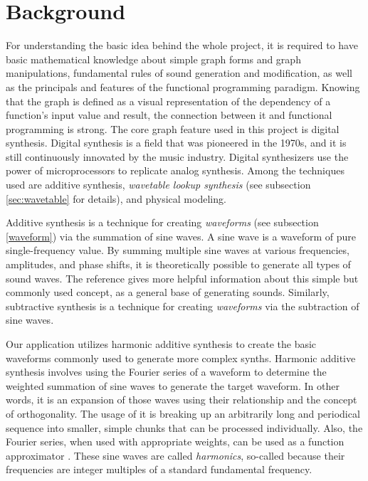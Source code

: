 \documentclass[runningheads]{llncs}
\begin{document}
\section{Background} \label{sec:background}

For understanding the basic idea behind the whole project, it is required to have basic mathematical knowledge about simple graph forms and graph manipulations, fundamental rules of sound generation and modification, as well as the principals and features of the functional programming paradigm. Knowing that the graph is defined as a visual representation of the dependency of a function's input value and result, the connection between it and functional programming is strong. The core graph feature used in this project is digital synthesis.
Digital synthesis is a field that was pioneered in the 1970s, and it is still continuously innovated by the music industry. Digital synthesizers\label{gloss:DigitalSythesizers} use the power of microprocessors to replicate analog synthesis. Among the techniques used are additive synthesis, \emph{wavetable lookup synthesis} (see subsection \ref{sec:wavetable} for details), and physical modeling.

Additive synthesis \label{gloss:additive} is a technique for creating \emph{waveforms} (see subsection \ref{waveform}) via the summation of sine waves. A sine wave is a waveform of pure single-frequency value. By summing multiple sine waves at various frequencies, amplitudes, and phase shifts\label{gloss:phaseShifted}, it is theoretically possible to generate all types of sound waves. The reference \cite{addSyn} gives more helpful information about this simple but commonly used concept, as a general base of generating sounds. Similarly, subtractive synthesis\label{gloss:subtractive} is a technique for creating \emph{waveforms} via the subtraction of sine waves.

Our application utilizes harmonic\label{gloss:harm} additive synthesis to create the basic waveforms commonly used to generate more complex synths. Harmonic additive synthesis involves using the Fourier series of a waveform to determine the weighted summation of sine waves to generate the target waveform. In other words, it is an expansion of those waves using their relationship and the concept of orthogonality. The usage of it is breaking up an arbitrarily long and periodical sequence into smaller, simple chunks that can be processed individually. Also, the Fourier series, when used with appropriate weights, can be used as a function approximator \cite{fourier}.  
These sine waves are called \textit{harmonics}, so-called because their frequencies are 
integer multiples of a standard fundamental frequency\label{gloss:freq}.
\end{document}
